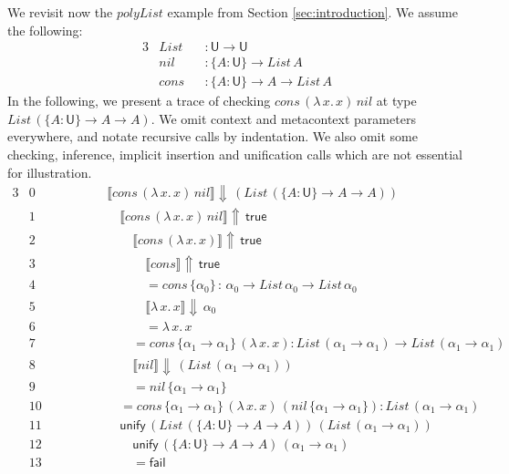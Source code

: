 \documentclass[acmsmall,review,anonymous,prologue,dvipsnames]{acmart}\settopmatter{printfolios=true,printccs=false,printacmref=false}
\renewcommand{\U}{\mathsf{U}}
\newcommand{\unify}{\mathsf{unify}}
\newcommand{\fail}{\mathsf{fail}}
\newcommand{\echeckt}[2]{\llbracket#1\rrbracket\!\Downarrow\,#2}
\newcommand{\einfert}[2]{\llbracket#1\rrbracket\!\Uparrow\,#2}
\newcommand{\true}{\mathsf{true}}
\theoremstyle{remark}
\begin{document}
We revisit now the $polyList$ example from Section \ref{sec:introduction}. We
assume the following:
\begin{alignat*}{3}
  & List && : \U \to \U \\
  & nil  && : \{A : \U\} \to List\,A\\
  & cons && : \{A : \U\} \to A \to List\,A
\end{alignat*}
In the following, we present a trace of checking $cons\,(\lambda\,x.\,x)\,nil$
at type $List\,(\{A : \U\}\to A \to A)$. We omit context and metacontext
parameters everywhere, and notate recursive calls by indentation. We also omit
some checking, inference, implicit insertion and unification calls which are not
essential for illustration.
\begin{alignat*}{3}
  & \scriptstyle{0 }\qquad\qquad && \echeckt{cons\,(\lambda\,x.\,x)\,nil}{(List\,(\{A : \U\}\to A \to A))}
     \hspace{14em}\\
  & \scriptstyle{1 }  && \quad \einfert{cons\,(\lambda\,x.\,x)\,nil}{\true} \\
  & \scriptstyle{2 }  && \qquad \einfert{cons\,(\lambda\,x.\,x)}{\true}\\
  & \scriptstyle{3 }  && \qquad\quad \einfert{cons}{\true}\\
  & \scriptstyle{4 }  && \qquad\quad = cons\,\{\alpha_0\}\,:\,\alpha_0 \to List\,\alpha_0 \to List\,\alpha_0\\
  & \scriptstyle{5 }  && \qquad\quad \echeckt{\lambda\,x.\,x}{\alpha_0}\\
  & \scriptstyle{6 }  && \qquad\quad = \lambda\,x.\,x\\
  & \scriptstyle{7 }  && \qquad = cons\,\{\alpha_1 \to \alpha_1\}\,(\lambda\,x.\,x) : List\,(\alpha_1\to\alpha_1) \to List\,(\alpha_1\to\alpha_1)\\
  & \scriptstyle{8 }  && \qquad \echeckt{nil}{(List\,(\alpha_1\to\alpha_1))}\\
  & \scriptstyle{9 }  && \qquad = nil\,\{\alpha_1\to\alpha_1\}\\
  & \scriptstyle{10} && \quad = cons\,\{\alpha_1 \to \alpha_1\}\,(\lambda\,x.\,x)\,(nil\,\{\alpha_1\to\alpha_1\}): List\,(\alpha_1\to\alpha_1)\\
  & \scriptstyle{11} && \quad \unify\,(List\,(\{A : \U\}\to A \to A))\,(List\,(\alpha_1\to\alpha_1))\\
  & \scriptstyle{12} && \qquad \unify\,(\{A : \U\}\to A \to A)\,(\alpha_1\to\alpha_1)\\
  & \scriptstyle{13} && \qquad = \fail
\end{alignat*}
\end{document}
